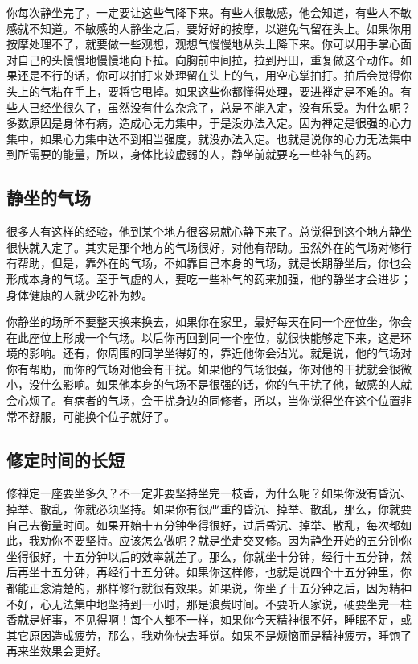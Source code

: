 \documentclass{book}
\begin{document}
你每次静坐完了，一定要让这些气降下来。有些人很敏感，他会知道，有些人不敏感就不知道。不敏感的人静坐之后，要好好的按摩，以避免气留在头上。如果你用按摩处理不了，就要做一些观想，观想气慢慢地从头上降下来。你可以用手掌心面对自己的头慢慢地慢慢地向下拉。向胸前中间拉，拉到丹田，重复做这个动作。如果还是不行的话，你可以拍打来处理留在头上的气，用空心掌拍打。拍后会觉得你头上的气粘在手上，要将它甩掉。如果这些你都懂得处理，要进禅定是不难的。有些人已经坐很久了，虽然没有什么杂念了，总是不能入定，没有乐受。为什么呢？多数原因是身体有病，造成心无力集中，于是没办法入定。因为禅定是很强的心力集中，如果心力集中达不到相当强度，就没办法入定。也就是说你的心力无法集中到所需要的能量，所以，身体比较虚弱的人，静坐前就要吃一些补气的药。

\subsection{静坐的气场}

很多人有这样的经验，他到某个地方很容易就心静下来了。总觉得到这个地方静坐很快就入定了。其实是那个地方的气场很好，对他有帮助。虽然外在的气场对修行有帮助，但是，靠外在的气场，不如靠自己本身的气场，就是长期静坐后，你也会形成本身的气场。至于气虚的人，要吃一些补气的药来加强，他的静坐才会进步；身体健康的人就少吃补为妙。

你静坐的场所不要整天换来换去，如果你在家里，最好每天在同一个座位坐，你会在此座位上形成一个气场。以后你再回到同一个座位，就很快能够定下来，这是环境的影响。还有，你周围的同学坐得好的，靠近他你会沾光。就是说，他的气场对你有帮助，而你的气场对他会有干扰。如果他的气场很强，你对他的干扰就会很微小，没什么影响。如果他本身的气场不是很强的话，你的气干扰了他，敏感的人就会心烦了。有病者的气场，会干扰身边的同修者，所以，当你觉得坐在这个位置非常不舒服，可能换个位子就好了。

\subsection{修定时间的长短}

修禅定一座要坐多久？不一定非要坚持坐完一枝香，为什么呢？如果你没有昏沉、掉举、散乱，你就必须坚持。如果你有很严重的昏沉、掉举、散乱，那么，你就要自己去衡量时间。如果开始十五分钟坐得很好，过后昏沉、掉举、散乱，每次都如此，我劝你不要坚持。应该怎么做呢？就是坐走交叉修。因为静坐开始的五分钟你坐得很好，十五分钟以后的效率就差了。那么，你就坐十分钟，经行十五分钟，然后再坐十五分钟，再经行十五分钟。如果你这样修，也就是说四个十五分钟里，你都能正念清楚的，那样修行就很有效果。如果说，你坐了十五分钟之后，因为精神不好，心无法集中地坚持到一小时，那是浪费时间。不要听人家说，硬要坐完一柱香就是好事，不见得啊！每个人都不一样，如果你今天精神很不好，睡眠不足，或其它原因造成疲劳，那么，我劝你快去睡觉。如果不是烦恼而是精神疲劳，睡饱了再来坐效果会更好。
\end{document}
